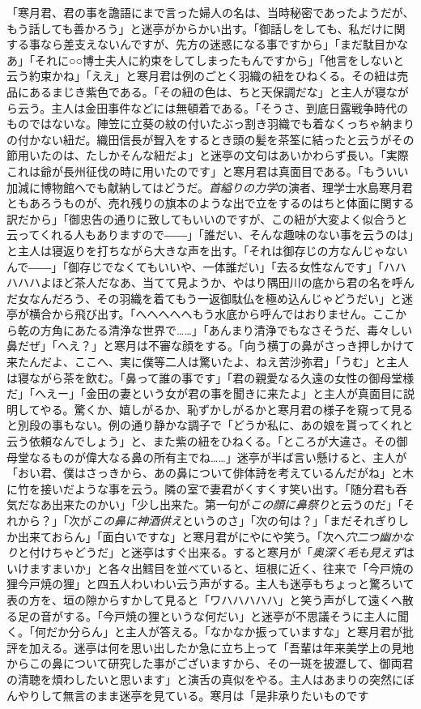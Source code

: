 \documentclass[12pt, openright]{book}
\begin{document}
「寒月君、君の事を譫語にまで言った婦人の名は、当時秘密であったようだが、もう話しても善かろう」と迷亭がからかい出す。「御話しをしても、私だけに関する事なら差支えないんですが、先方の迷惑になる事ですから」「まだ駄目かなあ」「それに○○博士夫人に約束をしてしまったもんですから」「他言をしないと云う約束かね」「ええ」と寒月君は例のごとく羽織の紐をひねくる。その紐は売品にあるまじき紫色である。「その紐の色は、ちと天保調だな」と主人が寝ながら云う。主人は金田事件などには無頓着である。「そうさ、到底日露戦争時代のものではないな。陣笠に立葵の紋の付いたぶっ割き羽織でも着なくっちゃ納まりの付かない紐だ。織田信長が聟入をするとき頭の髪を茶筌に結ったと云うがその節用いたのは、たしかそんな紐だよ」と迷亭の文句はあいかわらず長い。「実際これは爺が長州征伐の時に用いたのです」と寒月君は真面目である。「もういい加減に博物館へでも献納してはどうだ。\emph{首縊りの力学}の演者、理学士水島寒月君ともあろうものが、売れ残りの旗本のような出で立をするのはちと体面に関する訳だから」「御忠告の通りに致してもいいのですが、この紐が大変よく似合うと云ってくれる人もありますので――」「誰だい、そんな趣味のない事を云うのは」と主人は寝返りを打ちながら大きな声を出す。「それは御存じの方なんじゃないんで――」「御存じでなくてもいいや、一体誰だい」「去る女性なんです」「ハハハハハよほど茶人だなあ、当てて見ようか、やはり隅田川の底から君の名を呼んだ女なんだろう、その羽織を着てもう一返御駄仏を極め込んじゃどうだい」と迷亭が横合から飛び出す。「へへへへへもう水底から呼んではおりません。ここから乾の方角にあたる清浄な世界で\ldots{}\ldots{}」「あんまり清浄でもなさそうだ、毒々しい鼻だぜ」「へえ？」と寒月は不審な顔をする。「向う横丁の鼻がさっき押しかけて来たんだよ、ここへ、実に僕等二人は驚いたよ、ねえ苦沙弥君」「うむ」と主人は寝ながら茶を飲む。「鼻って誰の事です」「君の親愛なる久遠の女性の御母堂様だ」「へえー」「金田の妻という女が君の事を聞きに来たよ」と主人が真面目に説明してやる。驚くか、嬉しがるか、恥ずかしがるかと寒月君の様子を窺って見ると別段の事もない。例の通り静かな調子で「どうか私に、あの娘を貰ってくれと云う依頼なんでしょう」と、また紫の紐をひねくる。「ところが大違さ。その御母堂なるものが偉大なる鼻の所有主でね\ldots{}\ldots{}」迷亭が半ば言い懸けると、主人が「おい君、僕はさっきから、あの鼻について俳体詩を考えているんだがね」と木に竹を接いだような事を云う。隣の室で妻君がくすくす笑い出す。「随分君も呑気だなあ出来たのかい」「少し出来た。第一句が\emph{この顔に鼻祭り}と云うのだ」「それから？」「次が\emph{この鼻に神酒供え}というのさ」「次の句は？」「まだそれぎりしか出来ておらん」「面白いですな」と寒月君がにやにや笑う。「次へ\emph{穴二つ幽かなり}と付けちゃどうだ」と迷亭はすぐ出来る。すると寒月が「\emph{奥深く毛も見えず}はいけますまいか」と各々出鱈目を並べていると、垣根に近く、往来で「今戸焼の狸今戸焼の狸」と四五人わいわい云う声がする。主人も迷亭もちょっと驚ろいて表の方を、垣の隙からすかして見ると「ワハハハハハ」と笑う声がして遠くへ散る足の音がする。「今戸焼の狸というな何だい」と迷亭が不思議そうに主人に聞く。「何だか分らん」と主人が答える。「なかなか振っていますな」と寒月君が批評を加える。迷亭は何を思い出したか急に立ち上って「吾輩は年来美学上の見地からこの鼻について研究した事がございますから、その一斑を披瀝して、御両君の清聴を煩わしたいと思います」と演舌の真似をやる。主人はあまりの突然にぼんやりして無言のまま迷亭を見ている。寒月は「是非承りたいものです
\end{document}
